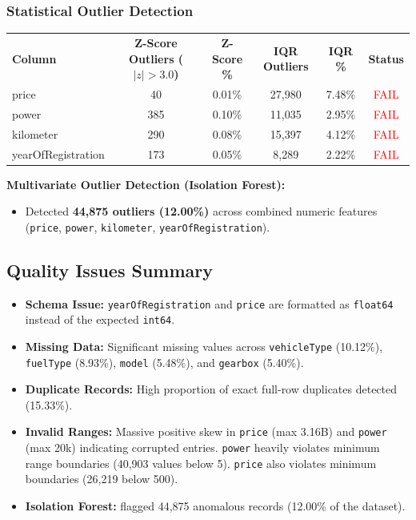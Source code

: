 \documentclass[12pt, a4paper]{article}
\begin{document}
\subsubsection{Statistical Outlier Detection}
\vspace{0.25cm}
\begin{center}
\renewcommand{\arraystretch}{1.4}
\begin{tabular}{l c c c c c}
\rowcolor{slate}
{\color{white}\small\bfseries Column} &
{\color{white}\small\bfseries Z-Score Outliers ($|z| > 3.0$)} &
{\color{white}\small\bfseries Z-Score \%} &
{\color{white}\small\bfseries IQR Outliers} &
{\color{white}\small\bfseries IQR \%} &
{\color{white}\small\bfseries Status} \\
\rowcolor{lightgray} price & 40 & 0.01\% & 27,980 & 7.48\%  & \textcolor{red}{FAIL}\\
\rowcolor{white} power & 385 & 0.10\% & 11,035 & 2.95\% & \textcolor{red}{FAIL}\\
\rowcolor{lightgray} kilometer & 290 & 0.08\% & 15,397 & 4.12\% & \textcolor{red}{FAIL}\\
\rowcolor{white} yearOfRegistration & 173 & 0.05\% & 8,289 & 2.22\% & \textcolor{red}{FAIL}\\
\end{tabular}
\end{center}
\vspace{0.2cm}

\textbf{Multivariate Outlier Detection (Isolation Forest):}
\begin{itemize}
  \item Detected \textbf{44,875 outliers (12.00\%)} across combined numeric features (\texttt{price}, \texttt{power}, \texttt{kilometer}, \texttt{yearOfRegistration}).
\end{itemize}

\subsection{Quality Issues Summary}
\begin{itemize}
  \item \textbf{Schema Issue:} \texttt{yearOfRegistration} and \texttt{price} are formatted as \texttt{float64} instead of the expected \texttt{int64}.
  \item \textbf{Missing Data:} Significant missing values across \texttt{vehicleType} (10.12\%), \texttt{fuelType} (8.93\%), \texttt{model} (5.48\%), and \texttt{gearbox} (5.40\%).
  \item \textbf{Duplicate Records:} High proportion of exact full-row duplicates detected (15.33\%).
  \item \textbf{Invalid Ranges:} Massive positive skew in \texttt{price} (max 3.16B)
  and \texttt{power} (max 20k)
  indicating corrupted entries. \texttt{power} heavily violates minimum range boundaries (40,903 values below 5). \texttt{price} also violates minimum boundaries (26,219 below 500).
  \item \textbf{Isolation Forest:} flagged 44,875 anomalous records (12.00\% of the dataset).
\end{itemize}
\end{document}
